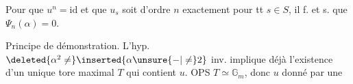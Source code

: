 Pour que  $u^n=\mathrm{id}$ et que $u_s$ soit d'ordre $n$
exactement pour tt $s\in S$, il f. et s. que $\Psi_n(\alpha)=0$.


Principe de démonstration. L'hyp. $\deleted{\alpha^2\ne}\inserted{\alpha\unsure{-|\ne}2}$ inv.
 implique déjà l'existence d'un unique tore maximal
$T$ qui contient $u$. OPS $T\simeq\mathbb G_m$, donc $u$ donné par une

